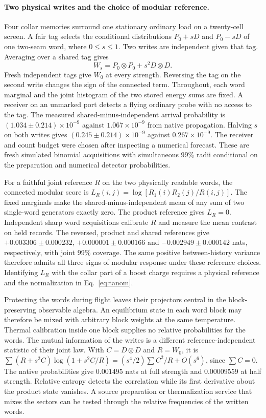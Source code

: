 \documentclass[11pt]{article}
\begin{document}
\paragraph{Two physical writes and the choice of modular reference.}
Four collar memories surround one stationary ordinary load on a twenty-cell
screen. A fair tag selects the conditional distributions $P_0+sD$ and
$P_0-sD$ of one two-seam word, where $0\le s\le1$. Two writes are
independent given that tag. Averaging over a shared tag gives
\[
 W_s=P_0\otimes P_0+s^2D\otimes D .
\]
Fresh independent tags give $W_0$ at every strength. Reversing the tag
on the second write changes the sign of the connected term. Throughout,
each word marginal and the joint histogram of the two stored energy sums
are fixed. A receiver on an unmarked port detects a flying ordinary
probe with no access to the tag. The measured shared-minus-independent
arrival probability is $(1.034\pm0.214)\times10^{-9}$ against
$1.067\times10^{-9}$ from native propagation. Halving $s$ on both writes
gives $(0.245\pm0.214)\times10^{-9}$ against $0.267\times10^{-9}$.
The receiver and count budget were chosen after inspecting a numerical
forecast. These are fresh simulated binomial acquisitions with simultaneous
99\% radii conditional on the preparation and numerical detector probabilities.

For a faithful joint reference $R$ on the two physically readable words,
the connected modular score is
$L_R(i,j)=\log[R_1(i)R_2(j)/R(i,j)]$. The fixed marginals make the
shared-minus-independent mean of any sum of two single-word generators
exactly zero. The product reference gives $L_R=0$. Independent sharp
word acquisitions calibrate $R$ and measure the mean contrast on held
records. The reversed, product and shared references give
$+0.003306\pm0.000232$, $+0.000001\pm0.000166$ and
$-0.002949\pm0.000142$ nats, respectively, with joint 99\% coverage.
The same positive between-history variance therefore admits all three
signs of modular response under these reference choices. Identifying
$L_R$ with the collar part of a boost charge requires a physical
reference and the normalization in Eq.~\eqref{eq:tanom}.

Protecting the words during flight leaves their projectors central
in the block-preserving observable algebra. An equilibrium state in
each word block may therefore be mixed with arbitrary block weights
at the same temperature. Thermal calibration inside one block supplies
no relative probabilities for the words. The mutual information of the
writes is a different reference-independent statistic of their joint
law. With $C=D\otimes D$ and $R=W_0$, it is
$\sum (R+s^2 C)\log(1+s^2 C/R)
 = (s^4/2)\sum C^2/R+O(s^6)$, since $\sum C=0$.
The native probabilities give $0.001495$ nats at full strength and
$0.00009559$ at half strength. Relative entropy detects the correlation
while its first derivative about the product state vanishes. A source
preparation or thermalization service that mixes the sectors can be
tested through the relative frequencies of the written words.
\end{document}
